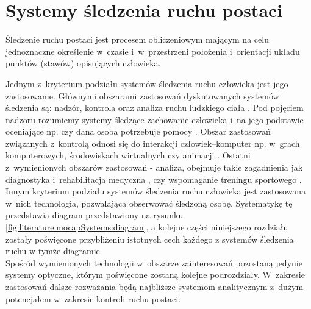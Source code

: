 \section{Systemy śledzenia ruchu postaci} \label{sec:literature:mocapSystems}

Śledzenie ruchu postaci jest procesem obliczeniowym mającym na celu jednoznaczne określenie w~czasie i~w~przestrzeni położenia i~orientacji układu punktów (stawów) opisujących człowieka. 

Jednym z~kryterium podziału systemów śledzenia ruchu człowieka jest jego zastosowanie. Głównymi obszarami zastosowań dyskutowanych systemów śledzenia są: nadzór, kontrola oraz analiza ruchu ludzkiego ciała \cite{Moeslund2001}. Pod pojęciem nadzoru rozumiemy systemy śledzące zachowanie człowieka i~na jego podstawie oceniające np. czy dana osoba potrzebuje pomocy \cite{Kwolek, Kepski2016, Haritaoglu}. Obszar zastosowań związanych z~kontrolą odnosi się do interakcji człowiek--komputer np. w~grach komputerowych, środowiskach wirtualnych czy animacji \cite{Moeslund2001a}. Ostatni z~wymienionych obszarów zastosowań - analiza, obejmuje takie zagadnienia jak diagnostyka i~rehabilitacja medyczna \cite{Even-zohar1984,XsensRehab}, czy wspomaganie treningu sportowego \cite{Neville2010,Noiumkar2013,inmotio}.\\

Innym kryterium podziału systemów śledzenia ruchu człowieka jest zastosowana w~nich technologia, pozwalająca obserwować śledzoną osobę. Systematykę tę przedstawia diagram przedstawiony na rysunku \ref{fig:literature:mocapSystems:diagram}, a kolejne części niniejszego rozdziału zostały poświęcone przybliżeniu istotnych cech każdego z systemów śledzenia ruchu w tymże diagramie \\

Spośród wymienionych technologii w~obszarze zainteresowań pozostaną jedynie systemy optyczne, którym poświęcone zostaną kolejne podrozdziały. W~zakresie zastosowań dalsze rozważania będą najbliższe systemom analitycznym z~dużym potencjałem w~zakresie kontroli ruchu postaci.

